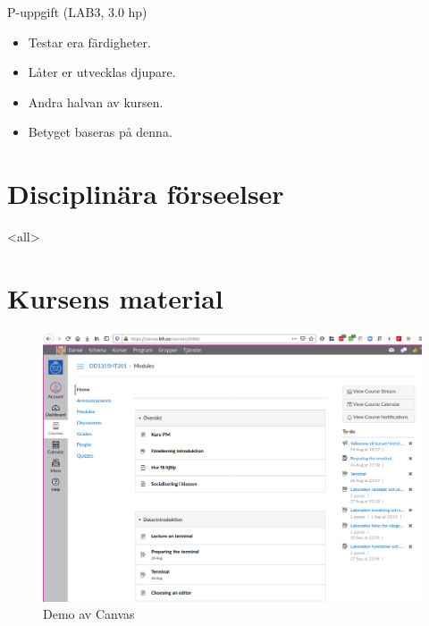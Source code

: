 \begin{frame}
  \begin{block}{P-uppgift (LAB3, 3.0 hp)}
    \begin{itemize}
      \item Testar era färdigheter.
      \item Låter er utvecklas djupare.
      \item Andra halvan av kursen.
      \item Betyget baseras på denna.
    \end{itemize}
  \end{block}
\end{frame}



\section{Disciplinära förseelser}

\mode<all>{}



\section{Kursens material}

\begin{frame}
  \begin{figure}
    \includegraphics[height=0.8\textheight]{canvas.png}
    \caption{Demo av Canvas}
  \end{figure}
\end{frame}


